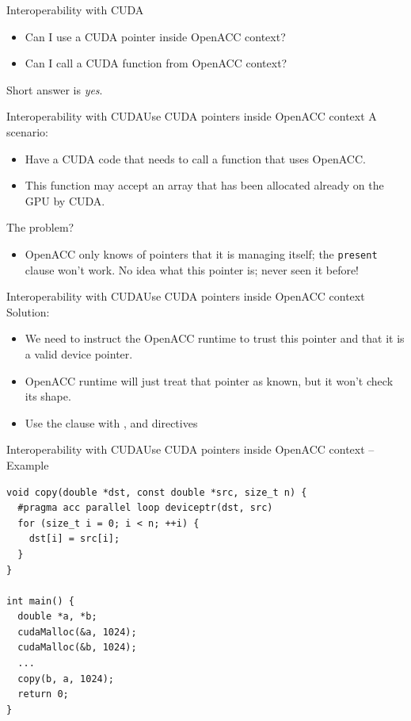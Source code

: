 \documentclass[12pt,aspectratio=169]{beamer}
\begin{document}
\begin{frame}{Interoperability with CUDA}
  \large
  \begin{itemize}
  \item Can I use a CUDA pointer inside OpenACC context?
    \vspace\baselineskip
  \item Can I call a CUDA function from OpenACC context?
  \end{itemize}
  \vfill
  Short answer is \emph{yes}.
\end{frame}

\begin{frame}{Interoperability with CUDA}{Use CUDA pointers inside OpenACC context}
  A scenario:
  \begin{itemize}
  \item Have a CUDA code that needs to call a function that uses OpenACC.
  \item This function may accept an array that has been allocated already on the GPU by CUDA.
  \end{itemize}
  \vfill
  The problem?
  \begin{itemize}
  \item OpenACC only knows of pointers that it is managing itself; the \texttt{present} clause won't work. No idea what this pointer is; never seen it before!
  \end{itemize}
\end{frame}

\begin{frame}{Interoperability with CUDA}{Use CUDA pointers inside OpenACC context}
  Solution:
  \vspace\baselineskip
  \begin{itemize}
  \item We need to instruct the OpenACC runtime to trust this pointer and that it is a valid device pointer.
  \item OpenACC runtime will just treat that pointer as known, but it won't check its shape.
  \item Use the  clause with
    ,  and  directives
  \end{itemize}
\end{frame}

\begin{frame}[fragile]{Interoperability with CUDA}{Use CUDA pointers inside OpenACC context -- Example}
  \begin{lstlisting}[style=CppStyle]
void copy(double *dst, const double *src, size_t n) {
  #pragma acc parallel loop deviceptr(dst, src)
  for (size_t i = 0; i < n; ++i) {
    dst[i] = src[i];
  }
}

int main() {
  double *a, *b;
  cudaMalloc(&a, 1024);
  cudaMalloc(&b, 1024);
  ...
  copy(b, a, 1024);
  return 0;
}
  \end{lstlisting}
\end{frame}
\end{document}
